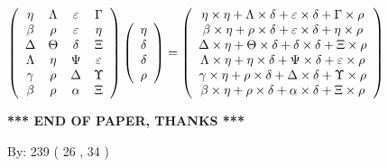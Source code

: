 \documentclass[12pt]{article}
\begin{document}
$  %
 \left( \begin{array}
 {
 c
 c
 c
 c
 }
 \eta & 
 \Lambda & 
 \varepsilon & 
 \Gamma \\ 
 \beta & 
 \rho & 
 \varepsilon & 
 \eta \\ 
 \Delta & 
 \Theta & 
 \delta & 
                    \Xi \\ 
 \Lambda & 
 \eta & 
 \Psi & 
 \varepsilon \\ 
 \gamma & 
 \rho & 
 \Delta & 
 \Upsilon \\ 
 \beta & 
 \rho & 
 \alpha & 
                    \Xi
 \end{array} \right)
 \left( \begin{array}
 {
 c
 }
 \eta \\ 
 \delta \\ 
 \delta \\ 
 \rho
 \end{array} \right)
=
  \left( \begin{array}
 {
 c
 }
 \eta \times  \eta   +  \Lambda \times  \delta   +  \varepsilon \times  \delta   +  \Gamma \times  \rho \\ 
 \beta \times  \eta   +  \rho \times  \delta   +  \varepsilon \times  \delta   +  \eta \times  \rho \\ 
 \Delta \times  \eta   +  \Theta \times  \delta   +  \delta \times  \delta   +                     \Xi \times  \rho \\ 
 \Lambda \times  \eta   +  \eta \times  \delta   +  \Psi \times  \delta   +  \varepsilon \times  \rho \\ 
 \gamma \times  \eta   +  \rho \times  \delta   +  \Delta \times  \delta   +  \Upsilon \times  \rho \\ 
 \beta \times  \eta   +  \rho \times  \delta   +  \alpha \times  \delta   +                     \Xi \times  \rho
 \end{array} \right)
$
 
 
 
   
   
 \vspace{0.2in}
 
   
   
   
   
\vspace{1.0in} 
{\textbf{\large{ *** END OF PAPER, THANKS *** }}} 
   
   
\hspace{1.0in} By: 
 239 ( 26 ,  34 )
   
   
   
   
\newpage 
\setcounter{page}{ 
    34001 } 
   
\end{document}

